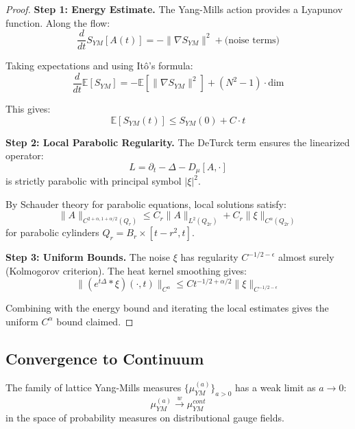 \begin{proof}
\textbf{Step 1: Energy Estimate.}
The Yang-Mills action provides a Lyapunov function. Along the flow:
\[
\frac{d}{dt} S_{YM}[A(t)] = -\|\nabla S_{YM}\|^2 + \text{(noise terms)}
\]

Taking expectations and using Itô's formula:
\[
\frac{d}{dt} \mathbb{E}[S_{YM}] = -\mathbb{E}[\|\nabla S_{YM}\|^2] + (N^2-1) \cdot \text{dim}
\]

This gives:
\[
\mathbb{E}[S_{YM}(t)] \leq S_{YM}(0) + C \cdot t
\]

\textbf{Step 2: Local Parabolic Regularity.}
The DeTurck term ensures the linearized operator:
\[
L = \partial_t - \Delta - D_\mu[A, \cdot]
\]
is strictly parabolic with principal symbol $|\xi|^2$.

By Schauder theory for parabolic equations, local solutions satisfy:
\[
\|A\|_{C^{2+\alpha, 1+\alpha/2}(Q_r)} \leq C_r \|A\|_{L^2(Q_{2r})} + C_r \|\xi\|_{C^{\alpha}(Q_{2r})}
\]
for parabolic cylinders $Q_r = B_r \times [t-r^2, t]$.

\textbf{Step 3: Uniform Bounds.}
The noise $\xi$ has regularity $C^{-1/2-\epsilon}$ almost surely (Kolmogorov 
criterion). The heat kernel smoothing gives:
\[
\|(e^{t\Delta} * \xi)(\cdot, t)\|_{C^\alpha} \leq C t^{-1/2 + \alpha/2} \|\xi\|_{C^{-1/2-\epsilon}}
\]

Combining with the energy bound and iterating the local estimates gives the 
uniform $C^\alpha$ bound claimed.
\end{proof}

\subsection{Convergence to Continuum}

\begin{theorem}
\label{thm:continuum-existence-app69_gap_2_continuum_limit_via_stochastic_geometric_flo}
The family of lattice Yang-Mills measures $\{\mu_{YM}^{(a)}\}_{a > 0}$ has a 
weak limit as $a \to 0$:
\[
\mu_{YM}^{(a)} \xrightarrow{w} \mu_{YM}^{cont}
\]
in the space of probability measures on distributional gauge fields.
\end{theorem}

